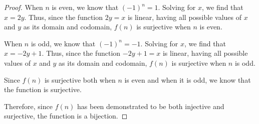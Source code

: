 \documentclass[11pt,titlepage]{article}		%
\theoremstyle{theorem}
\begin{document}
\begin{proof}
When $n$ is even, we know that $(-1)^n = 1$. Solving for $x$, we find that $x=2y$. Thus, since the function $2y=x$ is linear, having all possible values of $x$ and $y$ as its domain and codomain, $f(n)$ is surjective when $n$ is even.

When $n$ is odd, we know that $(-1)^n=-1$. Solving for $x$, we find that $x=-2y+1$. Thus, since the function $-2y+1=x$ is linear, having all possible values of $x$ and $y$ as its domain and codomain, $f(n)$ is surjective when $n$ is odd.

Since $f(n)$ is surjective both when $n$ is even and when it is odd, we know that the function is surjective.

Therefore, since $f(n)$ has been demonstrated to be both injective and surjective, the function is a bijection.
\end{proof}
\clearpage
\end{document}
